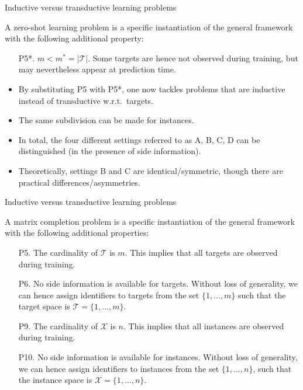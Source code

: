 \documentclass[]{beamer}
\begin{document}
\begin{frame}{Inductive versus transductive learning problems}
\begin{definition}
A zero-shot learning problem is a specific instantiation of the general framework with the following additional property: 
\begin{enumerate}
\item[P5*.] $m < m^* = |\mathcal{T}|$. Some targets are hence not observed during training, but may nevertheless appear at prediction time.  
\end{enumerate}
\end{definition}
\begin{itemize}
\item By substituting P5 with P5*, one now tackles problems that are inductive instead of transductive w.r.t.\ targets. 
\item The same subdivision can be made for instances. 
\item In total, the four different settings referred to as A, B, C, D can be distinguished (in the presence of side information). %
\item Theoretically, settings B and C are identical/symmetric, though there are practical differences/asymmetries. 
\end{itemize}
\end{frame}

\begin{frame}{Inductive versus transductive learning problems}
\begin{definition}
A matrix completion problem is a specific instantiation of the general framework with the following additional properties: 
\begin{enumerate}
\item[P5.] The cardinality of $\mathcal{T}$ is $m$. This implies that all targets are observed during training. 
\item[P6.] No side information is available for targets. Without loss of generality, we can hence assign identifiers to targets from the set $\{1,...,m\}$ such that the target space is $\mathcal{T} = \{1,...,m\}$.
\item[P9.] The cardinality of $\mathcal{X}$ is $n$. This implies that all instances are observed during training. 
\item[P10.] No side information is available for instances. Without loss of generality, we can hence assign identifiers to instances from the set $\{1,...,n\}$, such that the instance space is $\mathcal{X} = \{1,...,n\}$.
\end{enumerate}
\end{definition}
\end{frame}
\end{document}
